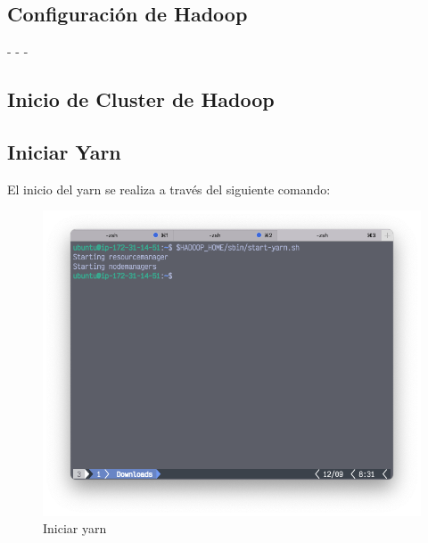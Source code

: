 \subsection{Configuración de Hadoop}


-
-
-

\subsection{Inicio de Cluster de Hadoop}



\subsection{Iniciar Yarn}
El inicio del yarn se realiza a través del siguiente comando: 
\begin{figure}[h]
	\centering
	\includegraphics[scale=.35] {img/43-start-yarn-sh}
	\caption{Iniciar yarn}
	\label{fig:43}
\end{figure}

